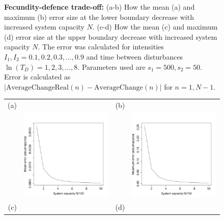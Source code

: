 \documentclass[a4paper]{article}
\begin{document}
\begin{figure}[th]
   \caption[Errors in approximating average change: fecundity-defence trade-off]{\textbf{Fecundity-defence trade-off:} (a-b)  How the mean (a) and maximum (b) error size at the lower boundary decrease with increased system capacity $N$. (c-d) How the mean (c) and maximum (d) error size at the upper boundary decrease with increased system capacity $N$. The error was calculated for intensities $I_1,I_2=0.1,0.2,0.3,...,0.9$ and time between disturbances $\ln(T_D)=1,2,3,...,8.$ Parameters used are $s_1=500,s_2=50$. Error is calculated as $| \text{AverageChangeReal}(n) - \text{AverageChange}(n) |$ for $n=1,N-1$.}
    \label{fig:fdtoapprox}
   \end{figure}   
    \begin{figure}[th]
\centering
   \begin{tabular}{rrrr}
   (a)&&(b)&\\
  &\includegraphics[width=2.5in]{GDmeanerr.pdf} && \includegraphics[width=2.5in]{GDmaxerr.pdf} \\
  (c)&&(d)&\\

\end{tabular}
\end{figure}
\end{document}
